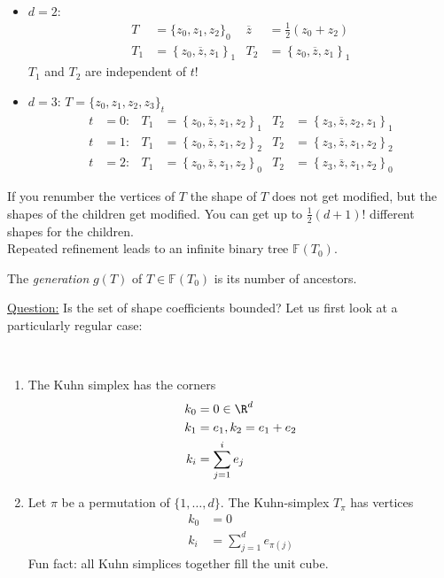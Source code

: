 \begin{example}\
	\begin{itemize}
		\item $d=2$:
			\begin{align*}
      T &= \{z_{0},z_{1},z_{2}\}_{0} & \overline{z}&= \frac{1}{2}\left(z_{0} + z_{2} \right)\\
      T_{1} &= \left\{ z_{0},\overline{z},z_{1}\right\}_{1}  & T_{2} &= \left\{z_{0},\overline{z},z_{1}\right\}_{1}
			\end{align*}
			$T_1$ and $T_2$ are independent of $t$!
			
		\item $d= 3$: \quad $T = \{ z_{0},z_{1},z_{2},z_{3} \}_{t}$
      \begin{align*}
        t&=0: & T_{1}&= \left\{ z_{0},\overline{z}, z_{1},z_{2}\right\}_{1} & T_{2}&= \left\{z_{3},\overline{z}, z_{2},z_{1}\right\}_{1}\\
        t&=1: & T_{1}&= \left\{z_{0},\overline{z}, z_{1},z_{2}\right\}_{2} & T_{2}&= \left\{z_{3},\overline{z}, z_{1},z_{2} \right\}_{2}\\
        t&=2: & T_{1}&= \left\{ z_{0},\overline{z}, z_{1},z_{2} \right\}_{0} & T_{2}&= \left\{ z_{3},\overline{z}, z_{1},z_{2} \right\}_{0}
			\end{align*}
	\end{itemize}
\end{example}
If you renumber the vertices of $T$ the shape of $T$ does not get modified, but the shapes of the children get modified. You can get up to $\frac{1}{2}\left(d+1 \right)!$ different shapes for the children.\\
Repeated refinement leads to an infinite binary tree $\mathbb{F}(T_{0})$.
\begin{definition}
	The \textit{generation} $g(T)$ of $T \in \mathbb{F}(T_{0})$ is its number of ancestors.
\end{definition}
\underline{Question:} Is the set of shape coefficients bounded?\nl
Let us first look at a particularly regular case:
\begin{definition}\
	\begin{enumerate}[label = \Roman*)]
		\item The Kuhn simplex has the corners
			\begin{align*}
				k_{0}&=0 \in \R^d\\
				k_{1}&=e_{1}, k_{2}=e_1 + e_{2}\\
				k_{i}&= \sum_{j=1}^{i} e_{j}
			\end{align*}
			
		\item Let $\pi$ be a permutation of $\{1,\dots ,d \}$. The Kuhn-simplex $T_{\pi}$ has vertices
			\begin{align*}
				k_{0}&=0 \\
				k_{i}&= \sum_{j=1}^{d} e_{\pi(j)}
			\end{align*}		
      Fun fact: all Kuhn simplices together fill the unit cube.
	\end{enumerate}
\end{definition}
